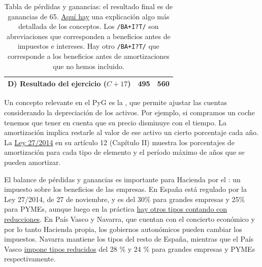 \documentclass[nochap,palatino,shortheader]{apuntes}
\newcommand{\study}[1]{#1} \newcommand{\substudy}[1]{#1}
\begin{document}
\begin{table}[hbtp]
\begin{minipage}{\textwidth}
\begin{tabular}{l|c|c}
\textbf{D) Resultado del ejercicio} ($C + 17$) & \textbf{495} & \textbf{560} \\ \bottomrule
\end{tabular}
\caption{Tabla de pérdidas y ganancias: el resultado final es de ganancias de 65. \href{http://www.plangeneralcontable.com/?tit=guia-del-pgc-de-pymes&name=GeTia&contentId=man_pgcpym&manPage=26}{Aquí hay} una explicación algo más detallada de los conceptos. Los \texttt{/BA+I?T/} son abreviaciones que corresponden a beneficios antes de impuestos e intereses. Hay otro \texttt{/BA+I?T/} que corresponde a los beneficios antes de amortizaciones que no hemos incluido.}
\label{tab:PyG}
\end{minipage}
\end{table}

Un concepto relevante en el PyG es la , que permite \substudy{ajustar las cuentas} considerando la \study{depreciación de los activos}.
Por ejemplo, si compramos un coche tenemos que tener en cuenta que su precio disminuye con el tiempo.
La amortización implica \substudy{restarle al valor de ese activo un cierto porcentaje cada año}.
La \href{http://www.boe.es/diario_boe/txt.php?id=BOE-A-2014-12328}{Ley 27/2014} en su artículo 12 (Capítulo II) muestra los \substudy{porcentajes de amortización para cada tipo de elemento y el período máximo de años} que se pueden amortizar.

El balance de pérdidas y ganancias es importante para Hacienda por el : un \substudy{impuesto sobre los beneficios} de las empresas.
En España está regulado por la Ley 27/2014, de 27 de noviembre, y es del \substudy{30\% para grandes} empresas y \substudy{25\% para PYMEs}, \substudy{aunque} luego en la práctica \href{http://www.agenciatributaria.es/AEAT.internet/Inicio/_Segmentos_/Empresas_y_profesionales/Empresas/Impuesto_sobre_Sociedades/Periodos_impositivos_iniciados_hasta_31_12_2014/Tipos_de_gravamen_aplicables_a_periodos_impositivos_iniciados_en_el_ano_2013_y_2014.shtml}{\substudy{hay} otros tipos contando con \substudy{reducciones}}.
En País Vasco y Navarra, que cuentan con el \substudy{concierto económico} y por lo tanto Hacienda propia, los gobiernos autonómicos pueden cambiar los impuestos. Navarra mantiene los tipos del resto de España, mientras que el País Vasco \href{http://www.ogasun.ejgv.euskadi.eus/r51-341/es/contenidos/informacion/6901/es_2316/es_12215.html}{impone tipos reducidos} del 28 \% y 24 \% para grandes empresas y PYMEs respectivamente.
\end{document}
